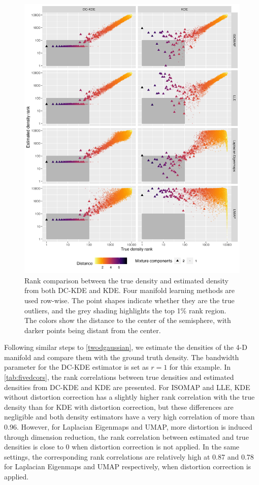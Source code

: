 \documentclass[12pt]{article}
\begin{document}
\begin{figure}

{\centering \includegraphics[width=0.9\linewidth]{figures/sim4d10000_density_comparison_4ml_radius10_k200_rankdensity_circleoutlier_with1rec} 

}

\caption{Rank comparison between the true density and estimated density from both DC-KDE and KDE. Four manifold learning methods are used row-wise. The point shapes indicate whether they are the true outliers, and the grey shading highlights the top 1\% rank region. The colors show the distance to the center of the semisphere, with darker points being distant from the center.}\label{fig:fivedisomapden}
\end{figure}

Following similar steps to \autoref{twodgaussian}, we estimate the densities of the 4-D manifold and compare them with the ground truth density. The bandwidth parameter for the DC-KDE estimator is set as \(r=1\) for this example. In \autoref{tab:fivedcors}, the rank correlations between true densities and estimated densities from DC-KDE and KDE are presented. For ISOMAP and LLE, KDE without distortion correction has a slightly higher rank correlation with the true density than for KDE with distortion correction, but these differences are negligible and both density estimators have a very high correlation of more than 0.96. However, for Laplacian Eigenmaps and UMAP, more distortion is induced through dimension reduction, the rank correlation between estimated and true densities is close to 0 when distortion correction is not applied. In the same settings, the corresponding rank correlations are relatively high at 0.87 and 0.78 for Laplacian Eigenmaps and UMAP respectively, when distortion correction is applied.
\end{document}
